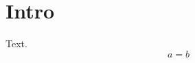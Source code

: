 \documentclass[a4paper]{mysmfw}
\begin{document}
\section{Intro}
Text.
\begin{equation}a=b\end{equation}
\end{document}
